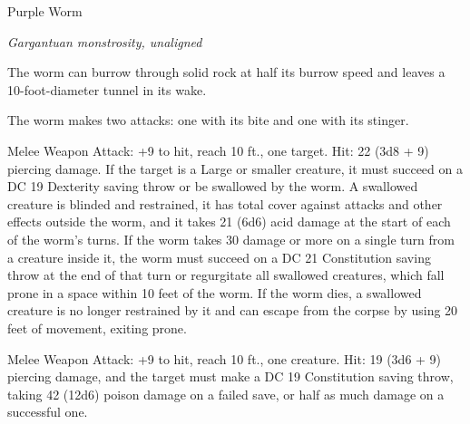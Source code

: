 \begin{monsterbox}{Purple Worm}
\begin{hangingpar}
\textit{Gargantuan monstrosity, unaligned}
\end{hangingpar}
\dndline%
\basics[%
armorclass = 18,
hitpoints = 15d20 + 90,
speed = {50 ft., burrow 30 ft.}
]
\dndline%
\stats[%
STR = \stat{28},
DEX = \stat{7},
CON = \stat{22},
INT = \stat{1},
WIS = \stat{8},
CHA = \stat{4}
]
\dndline%
\details[%
skills={},
damageimmunities={},
savingthrows={Con +11, Wis +4, },
conditionimmunities={},
damageresistances={},
damagevulnerabilities={},
senses={blindsight 30 ft., tremorsense 60 ft., passive Perception 9},
challenge=15
]
\dndline%
\begin{monsteraction}[Tunneler]
The worm can burrow through solid rock at half its burrow speed and leaves a 10-foot-diameter tunnel in its wake.
\end{monsteraction}
\begin{monsteraction}[Multiattack]
The worm makes two attacks: one with its bite and one with its stinger.
\end{monsteraction}
\begin{monsteraction}[Bite]
Melee Weapon Attack: +9 to hit, reach 10 ft., one target. Hit: 22 (3d8 + 9) piercing damage. If the target is a Large or smaller creature, it must succeed on a DC 19 Dexterity saving throw or be swallowed by the worm. A swallowed creature is blinded and restrained, it has total cover against attacks and other effects outside the worm, and it takes 21 (6d6) acid damage at the start of each of the worm's turns.
If the worm takes 30 damage or more on a single turn from a creature inside it, the worm must succeed on a DC 21 Constitution saving throw at the end of that turn or regurgitate all swallowed creatures, which fall prone in a space within 10 feet of the worm. If the worm dies, a swallowed creature is no longer restrained by it and can escape from the corpse by using 20 feet of movement, exiting prone.
\end{monsteraction}
\begin{monsteraction}
Melee Weapon Attack: +9 to hit, reach 10 ft., one creature. Hit: 19 (3d6 + 9) piercing damage, and the target must make a DC 19 Constitution saving throw, taking 42 (12d6) poison damage on a failed save, or half as much damage on a successful one.
\end{monsteraction}
\end{monsterbox}